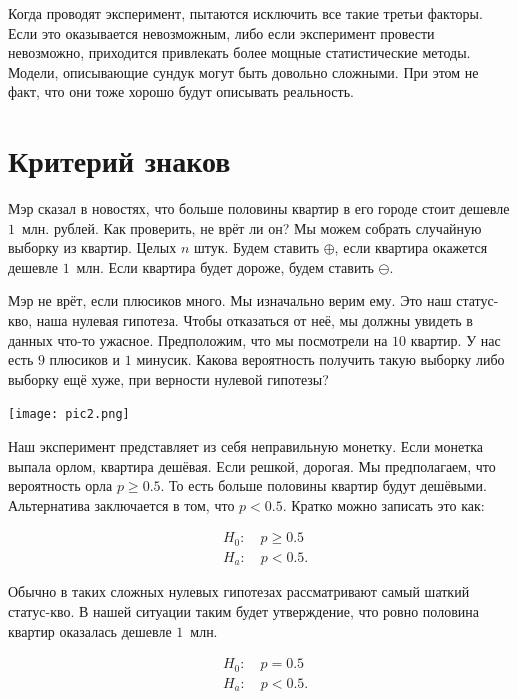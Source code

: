 \documentclass[12pt, a4paper, oneside]{article}
\begin{document}
Когда проводят эксперимент, пытаются исключить все такие третьи факторы. Если это оказывается невозможным, либо если эксперимент провести невозможно, приходится привлекать более мощные статистические методы. Модели, описывающие сундук могут быть довольно сложными. При этом не факт, что они тоже хорошо будут описывать реальность. 

\section{Критерий знаков}

Мэр сказал в новостях, что больше половины квартир в его городе стоит дешевле $1$~млн. рублей. Как проверить, не врёт ли он? Мы можем собрать случайную выборку из квартир. Целых $n$ штук. Будем ставить $\oplus$, если квартира окажется дешевле $1$~млн. Если квартира будет дороже, будем ставить $\ominus$. 

Мэр не врёт, если плюсиков много. Мы изначально верим ему. Это наш статус-кво, наша нулевая гипотеза. Чтобы отказаться от неё, мы должны увидеть в данных что-то ужасное. Предположим, что мы посмотрели на $10$ квартир. У нас есть $9$ плюсиков и $1$ минусик. Какова вероятность получить такую выборку либо выборку ещё хуже, при верности нулевой гипотезы? 

\begin{center} 
\texttt{[image: pic2.png]}
\end{center} 

Наш эксперимент представляет из себя неправильную монетку. Если монетка выпала орлом, квартира дешёвая. Если решкой, дорогая. Мы предполагаем, что вероятность орла $p \ge 0.5$. То есть больше половины квартир будут дешёвыми. Альтернатива заключается в том, что $p < 0.5$.  Кратко можно записать это как: 

\begin{equation*} 
    \begin{aligned} 
        &H_0: \quad p \ge 0.5 \\
        &H_a: \quad p < 0.5.
    \end{aligned} 
\end{equation*}

Обычно в таких сложных нулевых гипотезах рассматривают самый шаткий статус-кво. В нашей ситуации таким будет утверждение, что ровно половина квартир оказалась дешевле $1$~млн.

\begin{equation*} 
    \begin{aligned} 
        &H_0: \quad p = 0.5 \\
        &H_a: \quad p < 0.5.
    \end{aligned} 
\end{equation*}
\end{document}
